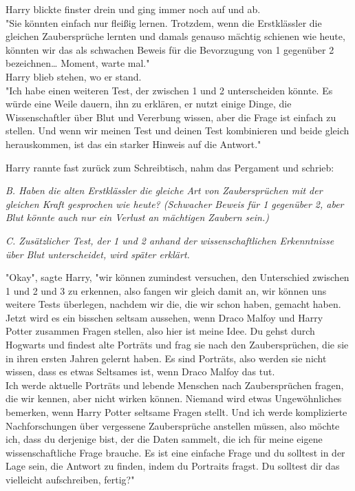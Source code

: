 {Harry blickte finster drein und ging immer noch auf und ab.\\ "Sie könnten einfach nur fleißig lernen. Trotzdem, wenn die Erstklässler die gleichen Zaubersprüche lernten und damals genauso mächtig schienen wie heute, könnten wir das als schwachen Beweis für die Bevorzugung von 1 gegenüber 2 bezeichnen… Moment, warte mal."\\ Harry blieb stehen, wo er stand.\\ "Ich habe einen weiteren Test, der zwischen 1 und 2 unterscheiden könnte. Es würde eine Weile dauern, ihn zu erklären, er nutzt einige Dinge, die Wissenschaftler über Blut und Vererbung wissen, aber die Frage ist einfach zu stellen. Und wenn wir meinen Test und deinen Test kombinieren und beide gleich herauskommen, ist das ein starker Hinweis auf die Antwort."

Harry rannte fast zurück zum Schreibtisch, nahm das Pergament und schrieb:

\emph{B. Haben die alten Erstklässler die gleiche Art von Zaubersprüchen mit der gleichen Kraft gesprochen wie heute? (Schwacher Beweis für 1 gegenüber 2, aber Blut könnte auch nur ein Verlust an mächtigen Zaubern sein.)}

\emph{C. Zusätzlicher Test, der 1 und 2 anhand der wissenschaftlichen Erkenntnisse über Blut unterscheidet, wird später erklärt.}

"Okay", sagte Harry, "wir können zumindest versuchen, den Unterschied zwischen 1 und 2 und 3 zu erkennen, also fangen wir gleich damit an, wir können uns weitere Tests überlegen, nachdem wir die, die wir schon haben, gemacht haben. Jetzt wird es ein bisschen seltsam aussehen, wenn Draco Malfoy und Harry Potter zusammen Fragen stellen, also hier ist meine Idee. Du gehst durch Hogwarts und findest alte Porträts und frag sie nach den Zaubersprüchen, die sie in ihren ersten Jahren gelernt haben. Es sind Porträts, also werden sie nicht wissen, dass es etwas Seltsames ist, wenn Draco Malfoy das tut.\\ Ich werde aktuelle Porträts und lebende Menschen nach Zaubersprüchen fragen, die wir kennen, aber nicht wirken können. Niemand wird etwas Ungewöhnliches bemerken, wenn Harry Potter seltsame Fragen stellt. Und ich werde komplizierte Nachforschungen über vergessene Zaubersprüche anstellen müssen, also möchte ich, dass du derjenige bist, der die Daten sammelt, die ich für meine eigene wissenschaftliche Frage brauche. Es ist eine einfache Frage und du solltest in der Lage sein, die Antwort zu finden, indem du Portraits fragst. Du solltest dir das vielleicht aufschreiben, fertig?"

}
